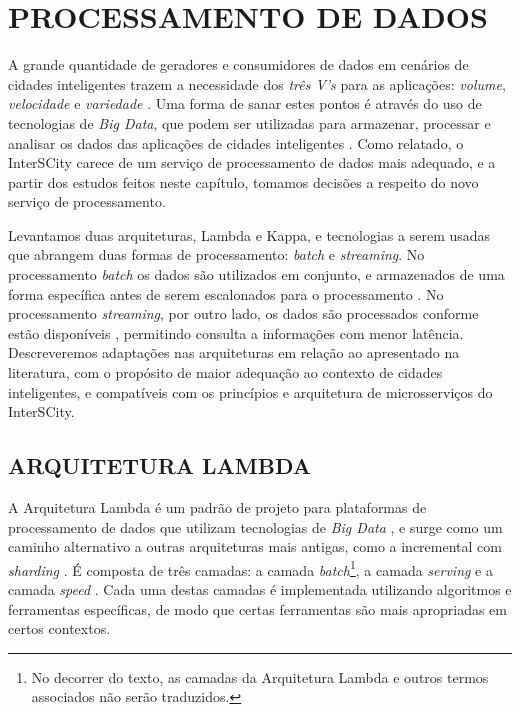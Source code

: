\chapter[PROCESSAMENTO DE DADOS]{PROCESSAMENTO DE DADOS}
\label{chapter:data}

A grande quantidade de geradores e consumidores de dados em cenários de cidades
inteligentes trazem a necessidade dos \textit{três V's} para as aplicações:
\textit{volume}, \textit{velocidade} e \textit{variedade} \cite{alnuaimi2015}.
Uma forma de sanar estes pontos é através do uso de tecnologias de
\textit{Big Data}, que podem ser utilizadas para armazenar, processar e analisar
os dados das aplicações de cidades inteligentes \cite{alnuaimi2015}. Como
relatado, o InterSCity carece de um serviço de processamento de dados mais
adequado, e a partir dos estudos feitos neste capítulo, tomamos decisões a
respeito do novo serviço de processamento.

Levantamos duas arquiteturas, Lambda e Kappa, e tecnologias a serem usadas
que abrangem duas formas de processamento: \textit{batch} e
\textit{streaming}. No processamento \textit{batch} os dados são utilizados
em conjunto, e armazenados de uma forma específica antes de serem escalonados
para o processamento \cite{zheng2015real}. No processamento
\textit{streaming}, por outro lado, os dados são processados conforme estão
disponíveis \cite{zheng2015real}, permitindo consulta a informações com menor
latência. Descreveremos adaptações nas arquiteturas em relação ao apresentado
na literatura, com o propósito de maior adequação ao contexto de cidades
inteligentes, e compatíveis com os princípios e arquitetura de
microsserviços do InterSCity.

\section{ARQUITETURA LAMBDA}

A Arquitetura Lambda é um padrão de projeto para plataformas de processamento
de dados que utilizam tecnologias de \textit{Big Data} \cite{kiran2015}, e
surge como um caminho alternativo a outras arquiteturas mais antigas, como a
incremental com \textit{sharding} \cite{marz2015}. É composta de três camadas:
a camada \textit{batch}\footnote{No decorrer do texto, as camadas da
Arquitetura Lambda e outros termos associados não serão traduzidos.}, a camada
\textit{serving} e a camada \textit{speed} \cite{kiran2015}. Cada uma destas
camadas é implementada utilizando algoritmos e ferramentas específicas, de modo
que certas ferramentas são mais apropriadas em certos contextos.

